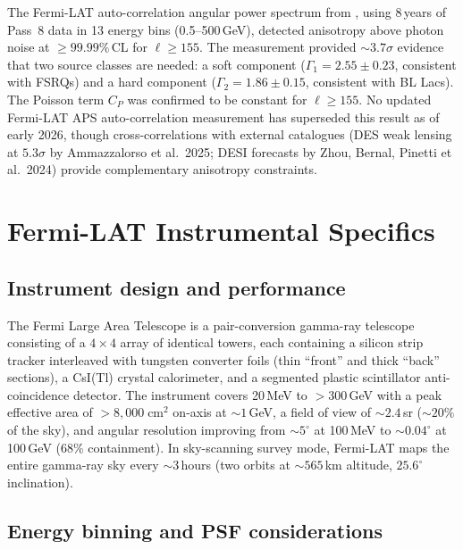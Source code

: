 \documentclass[10pt,a4paper]{article}
\begin{document}
The Fermi-LAT auto-correlation angular power spectrum from \citet{Ackermann2018APS}, using 8\,years of Pass~8 data in 13 energy bins (0.5--500\,GeV), detected anisotropy above photon noise at $\geq 99.99\%$\,CL for $\ell \geq 155$. The measurement provided $\sim3.7\sigma$ evidence that two source classes are needed: a soft component ($\Gamma_1 = 2.55 \pm 0.23$, consistent with FSRQs) and a hard component ($\Gamma_2 = 1.86 \pm 0.15$, consistent with BL Lacs). The Poisson term $C_P$ was confirmed to be constant for $\ell \geq 155$. No updated Fermi-LAT APS auto-correlation measurement has superseded this result as of early 2026, though cross-correlations with external catalogues (DES weak lensing at $5.3\sigma$ by Ammazzalorso et al.\ 2025; DESI forecasts by Zhou, Bernal, Pinetti et al.\ 2024) provide complementary anisotropy constraints.


\section{Fermi-LAT Instrumental Specifics}
\label{sec:fermi_lat}

\subsection{Instrument design and performance}

The Fermi Large Area Telescope is a pair-conversion gamma-ray telescope consisting of a $4\times4$ array of identical towers, each containing a silicon strip tracker interleaved with tungsten converter foils (thin ``front'' and thick ``back'' sections), a CsI(Tl) crystal calorimeter, and a segmented plastic scintillator anti-coincidence detector. The instrument covers 20\,MeV to $>300$\,GeV with a peak effective area of $>8{,}000\;\mathrm{cm^2}$ on-axis at $\sim1$\,GeV, a field of view of $\sim2.4$\,sr ($\sim20\%$ of the sky), and angular resolution improving from $\sim5^\circ$ at 100\,MeV to $\sim0.04^\circ$ at 100\,GeV (68\% containment). In sky-scanning survey mode, Fermi-LAT maps the entire gamma-ray sky every $\sim3$\,hours (two orbits at $\sim565$\,km altitude, $25.6^\circ$ inclination).

\subsection{Energy binning and PSF considerations}
\end{document}
